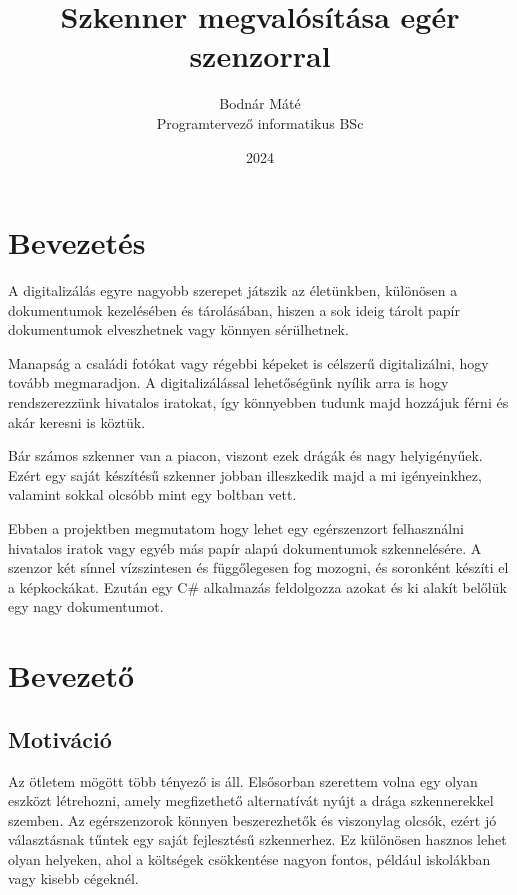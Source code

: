 \documentclass[]{thesis-ekf}
\theoremstyle{definition}
\theoremstyle{remark}
\begin{document}
\title{Szkenner megvalósítása egér szenzorral}
\author{Bodnár Máté\\Programtervező informatikus BSc}
\date{2024}
\maketitle

\tableofcontents

\chapter*{Bevezetés}
A digitalizálás egyre nagyobb szerepet játszik az életünkben, különösen a dokumentumok kezelésében és tárolásában, hiszen a sok ideig tárolt papír dokumentumok elveszhetnek vagy könnyen sérülhetnek.

Manapság a családi fotókat vagy régebbi képeket is célszerű digitalizálni, hogy tovább megmaradjon. A digitalizálással lehetőségünk nyílik arra is hogy rendszerezzünk hivatalos iratokat, így könnyebben tudunk majd hozzájuk férni és akár keresni is köztük. 

Bár számos szkenner van a piacon, viszont ezek drágák és nagy helyigényűek. Ezért egy saját készítésű szkenner jobban illeszkedik majd a mi igényeinkhez, valamint sokkal olcsóbb mint egy boltban vett. 

Ebben a projektben megmutatom hogy lehet egy egérszenzort felhasználni hivatalos iratok vagy egyéb más papír alapú dokumentumok szkennelésére. A szenzor két sínnel vízszintesen és függőlegesen fog mozogni, és soronként készíti el a képkockákat. Ezután egy C\# alkalmazás feldolgozza azokat és ki alakít belőlük egy nagy dokumentumot.

\chapter{Bevezető}

\section{Motiváció}
Az ötletem mögött több tényező is áll. Elsősorban szerettem volna egy olyan eszközt létrehozni, amely megfizethető alternatívát nyújt a drága szkennerekkel szemben. Az egérszenzorok könnyen beszerezhetők és viszonylag olcsók, ezért jó választásnak tűntek egy saját fejlesztésű szkennerhez. Ez különösen hasznos lehet olyan helyeken, ahol a költségek csökkentése nagyon fontos, például iskolákban vagy kisebb cégeknél.
\end{document}
